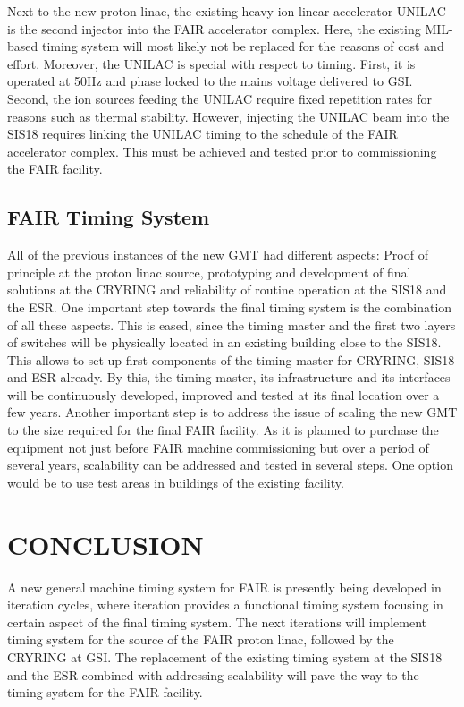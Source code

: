 \documentclass{JAC2003}
\begin{document}
Next to   the   new proton   linac,  the existing     heavy ion linear
accelerator UNILAC  is the second injector  into the  FAIR accelerator
complex.  Here, the existing MIL-based timing  system will most likely
not be  replaced for the reasons   of cost and effort.   Moreover, the
UNILAC is special  with respect  to  timing. First, it  is operated at
50Hz and phase locked to the mains voltage  delivered to GSI.  Second,
the ion sources feeding the UNILAC require  fixed repetition rates for
reasons such as thermal stability.  However, injecting the UNILAC beam
into the SIS18 requires linking  the UNILAC timing  to the schedule of
the FAIR accelerator complex.  This must  be achieved and tested prior
to commissioning the FAIR facility.


\subsection{FAIR Timing System}

All of the previous instances of
the new GMT had different aspects: Proof of principle at
the proton linac source, prototyping and development of
final solutions at the CRYRING and reliability of routine
operation at the SIS18 and the ESR. One important step 
towards the final timing system is the combination of all these
aspects. This is eased, since the timing master and the first
two layers of switches will be physically located in an existing 
building close to the SIS18. This allows to set up first
components of the timing master for CRYRING, SIS18 and
ESR already. By this, the timing master, its infrastructure
and its interfaces will be continuously developed, improved
and tested at its final location over a few years.
Another important step is to address the issue of scaling
the new GMT to the size required for the final FAIR facility. 
As it is planned to purchase the equipment not just
before FAIR machine commissioning but over a period of
several years, scalability can be addressed and tested in several steps. 
One option would be to use test areas in buildings of the existing facility.


\section{CONCLUSION}

A new general machine timing system for FAIR is presently being developed in
iteration cycles, where iteration provides a functional timing system
focusing in certain aspect of the final timing system. 
The next iterations  will implement timing system  for the source of the FAIR proton linac, 
followed by the CRYRING at GSI. The replacement of the existing timing 
system at the SIS18 and the ESR combined with addressing scalability will 
pave the way to the timing system for the FAIR facility.
\end{document}
